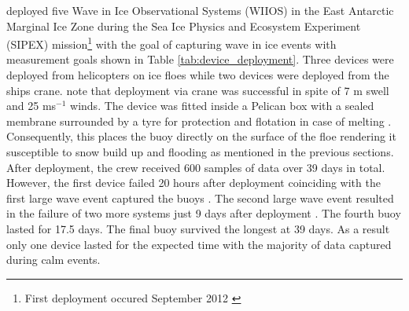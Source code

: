 \textcite{kohout2015device} deployed five Wave in Ice Observational Systems (WIIOS) in the East Antarctic Marginal Ice Zone during the Sea Ice Physics and Ecosystem Experiment (SIPEX) mission\footnote{First deployment occured September 2012 \cite{kohout2015device}} with the goal of capturing wave in ice events with measurement goals shown in Table \ref{tab:device_deployment}. Three devices were deployed from helicopters on ice floes while two devices were deployed from the ships crane. \textcite{kohout2015device}
note that deployment via crane was successful in spite of 7 m swell and 25 ms$^{-1}$ winds. The device was fitted inside a Pelican box with a sealed membrane surrounded by a tyre for protection and flotation in case of melting \cite{kohout2015device}. Consequently, this places the buoy directly on the surface of the floe rendering it susceptible to snow build up and flooding as mentioned in the previous sections.  After deployment, the crew received 600 samples of data over 39 days in total. However, the first device failed 20 hours after deployment coinciding with the first large wave event captured the buoys \cite{kohout2015device}. The second large wave event resulted in the failure of two more systems just 9 days after deployment \cite{kohout2015device}. The fourth buoy lasted for 17.5 days. The final buoy survived the longest at 39 days. As a result only one device lasted for the expected time with the majority of data captured during calm events.

